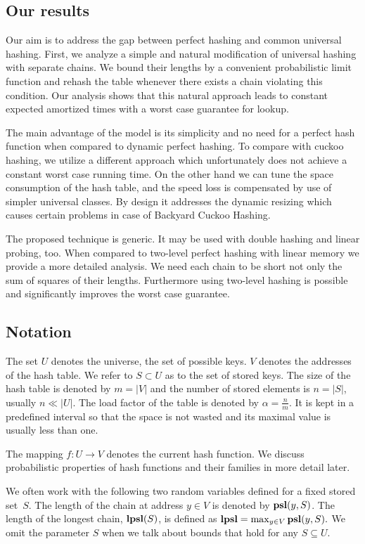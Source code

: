 \subsection{Our results}
Our aim is to address the gap between perfect hashing and common universal hashing.
First, we analyze a simple and natural modification of universal hashing with separate chains.
We bound their lengths by a convenient probabilistic limit function and rehash the table whenever there exists a chain violating this condition.
Our analysis shows that this natural approach leads to constant expected amortized times with a worst case guarantee for lookup.

The main advantage of the model is its simplicity and no need for a perfect hash function when compared to dynamic perfect hashing.
To compare with cuckoo hashing, we utilize a different approach which unfortunately does not achieve a constant worst case running time.
On the other hand we can tune the space consumption of the hash table, and the speed loss is compensated by use of simpler universal classes.
By design it addresses the dynamic resizing which causes certain problems in case of Backyard Cuckoo Hashing.

The proposed technique is generic. It may be used with double hashing and linear probing, too. 
When compared to two-level perfect hashing with linear memory we provide a more detailed analysis. 
We need each chain to be short not only the sum of squares of their lengths.
Furthermore using two-level hashing is possible and significantly improves the worst case guarantee.

\subsection{Notation}
The set $U$ denotes the universe, the set of possible keys. $V$ denotes the addresses of the hash table. We refer to $S \subset U$ as to the set of stored keys. The size of the hash table is denoted by $m = |V|$ and the number of stored elements is $n = |S|$, usually $n \ll |U|$. The load factor of the table is denoted by $\alpha = \frac{n}{m}$. It is kept in a predefined interval so that the space is not wasted and its maximal value is usually less than one.

The mapping $f\colon U \rightarrow V$ denotes the current hash function. We discuss probabilistic properties of hash functions and their families in more detail later.

We often work with the following two random variables defined for a fixed stored set~$S$. The length of the chain at address $y \in V$ is denoted by $\mathbf{psl}(y, S)$. The length of the longest chain, $\mathbf{lpsl}(S)$, is defined as $\mathbf{lpsl} = \max_{y \in V} \mathbf{psl}(y, S).$ We omit the parameter $S$ when we talk about bounds that hold for any $S \subseteq U$.

